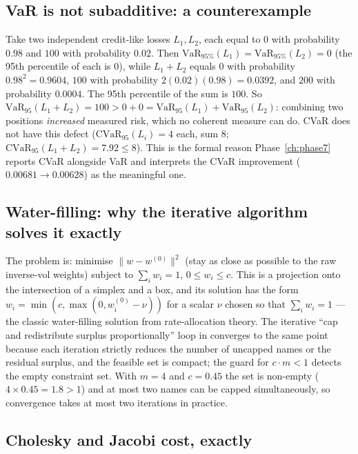 \subsection{VaR is not subadditive: a counterexample}
\label{sec:der:var}

Take two independent credit-like losses $L_1,L_2$, each equal to $0$ with probability
$0.98$ and $100$ with probability $0.02$. Then
$\mathrm{VaR}_{95\%}(L_1)=\mathrm{VaR}_{95\%}(L_2)=0$ (the 95th percentile of each is 0),
while $L_1+L_2$ equals $0$ with probability $0.98^2=0.9604$, $100$ with probability
$2(0.02)(0.98)=0.0392$, and $200$ with probability $0.0004$. The 95th percentile of the sum
is $100$. So $\mathrm{VaR}_{95}(L_1+L_2)=100 > 0+0 = \mathrm{VaR}_{95}(L_1)+\mathrm{VaR}_{95}(L_2)$:
combining two positions \emph{increased} measured risk, which no coherent measure can do.
CVaR does not have this defect ($\mathrm{CVaR}_{95}(L_i)=4$ each, sum $8$;
$\mathrm{CVaR}_{95}(L_1+L_2)=7.92\le8$). This is the formal reason
Phase~\ref{ch:phase7} reports CVaR alongside VaR and interprets the CVaR improvement
($0.00681\to0.00628$) as the meaningful one.

\subsection{Water-filling: why the iterative algorithm solves it exactly}
\label{sec:der:waterfill}

The problem is: minimise $\lVert w-w^{(0)}\rVert^2$ (stay as close as possible to the raw
inverse-vol weights) subject to $\sum_i w_i=1$, $0\le w_i\le c$. This is a projection onto
the intersection of a simplex and a box, and its solution has the form
$w_i=\min(c,\max(0,w^{(0)}_i-\nu))$ for a scalar $\nu$ chosen so that $\sum_i w_i=1$ ---
the classic water-filling solution from rate-allocation theory. The iterative
``cap and redistribute surplus proportionally'' loop in
 converges to the same point because each
iteration strictly reduces the number of uncapped names or the residual surplus, and the
feasible set is compact; the guard for $c\cdot m<1$ detects the empty constraint set. With
$m=4$ and $c=0.45$ the set is non-empty ($4\times0.45=1.8>1$) and at most two names can be
capped simultaneously, so convergence takes at most two iterations in practice.

\subsection{Cholesky and Jacobi cost, exactly}
\label{sec:der:flops}

